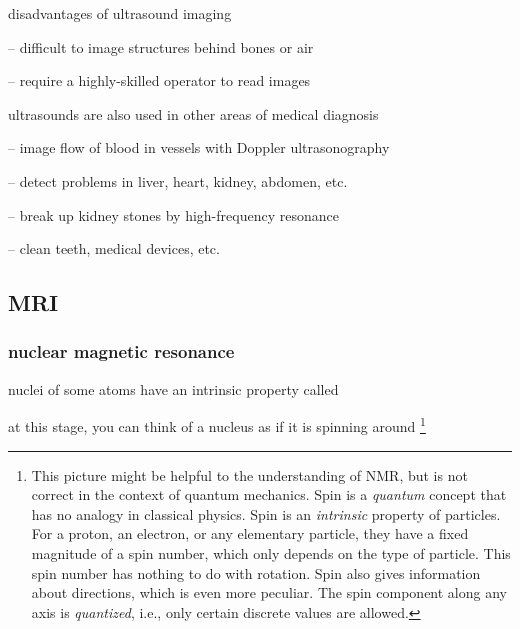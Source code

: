 \cmt disadvantages of ultrasound imaging

\begin{compactitem}
	\item[--] difficult to image structures behind bones or air
	
	\item[--] require a highly-skilled operator to read images
\end{compactitem}
	
\cmt ultrasounds are also used in other areas of medical diagnosis
	
\begin{compactitem}
	\item[--] image flow of blood in vessels with Doppler ultrasonography
	
	\item[--] detect problems in liver, heart, kidney, abdomen, etc.
	
	\item[--] break up kidney stones by high-frequency resonance
	
	\item[--] clean teeth, medical devices, etc.
\end{compactitem}




\subsection{MRI}

\subsubsection{nuclear magnetic resonance}

nuclei of some atoms have an intrinsic property called 

at this stage, you can think of a nucleus as if it is spinning around
\footnote{This picture might be helpful to the understanding of NMR, but is not correct in the context of quantum mechanics. Spin is a \emph{quantum} concept that has no analogy in classical physics. Spin is an \emph{intrinsic} property of particles. For a proton, an electron, or any elementary particle, they have a fixed magnitude of a spin number, which only depends on the type of particle. This spin number has nothing to do with rotation. Spin also gives information about directions, which is even more peculiar. The spin component along any axis is \emph{quantized}, i.e., only certain discrete values are allowed.}

